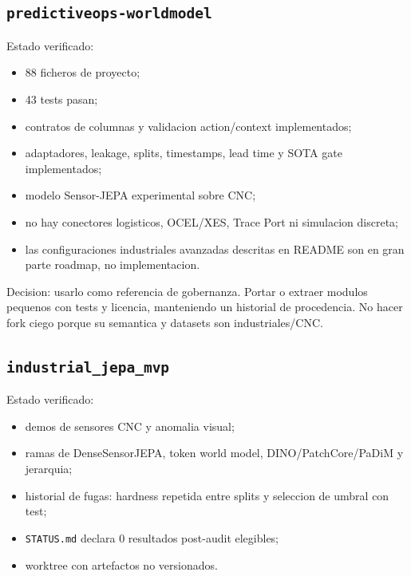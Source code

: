 \documentclass[
  spanish,
  10pt,
  a4paper,
]{article}
\providecommand{\tightlist}{%
  \setlength{\itemsep}{0pt}\setlength{\parskip}{0pt}}
\begin{document}
\subsection{\texorpdfstring{\texttt{predictiveops-worldmodel}}{predictiveops-worldmodel}}\label{predictiveops-worldmodel}

Estado verificado:

\begin{itemize}
\tightlist
\item
  88 ficheros de proyecto;
\item
  43 tests pasan;
\item
  contratos de columnas y validacion action/context implementados;
\item
  adaptadores, leakage, splits, timestamps, lead time y SOTA gate
  implementados;
\item
  modelo Sensor-JEPA experimental sobre CNC;
\item
  no hay conectores logisticos, OCEL/XES, Trace Port ni simulacion
  discreta;
\item
  las configuraciones industriales avanzadas descritas en README son en
  gran parte roadmap, no implementacion.
\end{itemize}

Decision: usarlo como referencia de gobernanza. Portar o extraer modulos
pequenos con tests y licencia, manteniendo un historial de procedencia.
No hacer fork ciego porque su semantica y datasets son industriales/CNC.

\subsection{\texorpdfstring{\texttt{industrial\_jepa\_mvp}}{industrial\_jepa\_mvp}}\label{industrial_jepa_mvp}

Estado verificado:

\begin{itemize}
\tightlist
\item
  demos de sensores CNC y anomalia visual;
\item
  ramas de DenseSensorJEPA, token world model, DINO/PatchCore/PaDiM y
  jerarquia;
\item
  historial de fugas: hardness repetida entre splits y seleccion de
  umbral con test;
\item
  \texttt{STATUS.md} declara 0 resultados post-audit elegibles;
\item
  worktree con artefactos no versionados.
\end{itemize}
\end{document}
